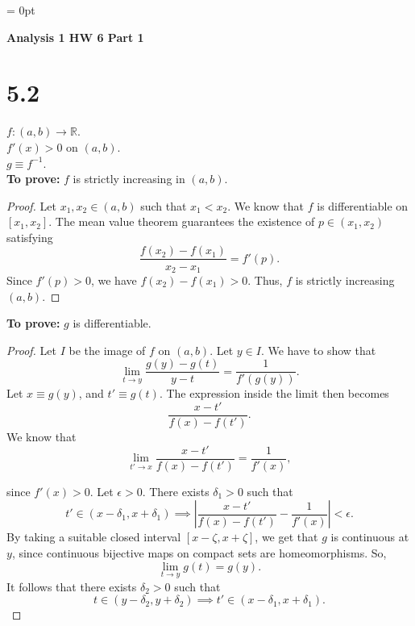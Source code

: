 \documentclass[12pt]{article}
\begin{document}


\setcounter{section}{0}
\renewcommand{\thesection}{}


\parindent = 0pt


      {\bf Analysis 1 HW 6 Part 1}

\section{5.2}

$f:(a, b)\to \mathbb{R}$.\\
$f'(x)>0$ on $(a, b)$.\\
$g\equiv f^{-1}$.\\

{\bf To prove:} $f$ is strictly increasing in $(a, b)$. 

\begin{proof}
      

Let $x_{1}, x_{2}\in(a, b)$ such that $x_{1}<x_{2}$. We know that $f$ is differentiable on $[x_{1}, x_{2}]$. The mean value theorem guarantees the existence of $p\in(x_{1}, x_{2})$ satisfying
$$
\frac{{f(x_{2})-f(x_{1})}}{x_{2}-x_{1}}=f'(p).
$$
Since $f'(p)> 0$, we have $f(x_{2})-f(x_{1})> 0$. Thus, $f$ is strictly increasing $(a, b)$.
\end{proof}
{\bf To prove:} $g$ is differentiable.

\begin{proof}
Let $I$ be the image of $f$ on $(a, b)$. Let $y\in I$. We have to show that
$$
\lim_{ t \to y } \frac{{g(y)-g(t)}}{y-t} = \frac{1}{f'(g(y))}.
$$
Let $x\equiv g(y)$, and $t'\equiv g(t)$. The expression inside the limit then becomes
$$
\frac{{x-t'}}{f(x)-f(t')}.
$$
We know that
$$
\lim_{ t' \to x } \frac{{x-t'}}{f(x)-f(t')}= \frac{1}{f'(x)},
$$

since $f'(x)>0$. Let $\epsilon>0$. There exists $\delta_{1}>0$ such that 
$$
t'\in(x-\delta_{1}, x+\delta_{1}) \implies \left\lvert  \frac{{x-t'}}{f(x)-f(t')}- \frac{1}{f'(x)} \right\rvert <\epsilon.
$$
By taking a suitable closed interval $[x-\zeta, x+\zeta]$, we get that $g$ is continuous at $y$, since continuous bijective maps on compact sets are homeomorphisms. So, 
$$
\lim_{ t \to y } g(t)=g(y).
$$
It follows that there exists $\delta_{2}>0$ such that 
$$
t\in(y-\delta_{2}, y+\delta_{2})\implies t'\in(x-\delta_{1}, x+\delta_{1}).
$$
\end{proof}
\end{document}

